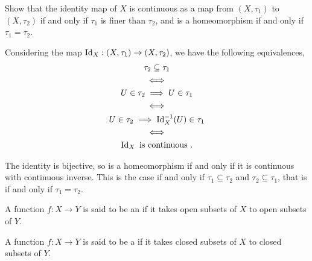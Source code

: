 \begin{exercise}
	\begin{problem}
	Show that the identity map of $ X $ is continuous as a map from $ ( X, \tau_{1} ) $ to $ ( X, \tau_{2} ) $ if and only if $ \tau_{1} $ is finer than $ \tau_{2} $, and is a homeomorphism if and only if $ \tau_{1} = \tau_{2} $.
	\end{problem}
	\begin{solution}
		Considering the map $ \operatorname{Id}_{X}:( X, \tau_{1} )\to ( X, \tau_{2} ) $, we have the following equivalences,
		\begin{gather*}
			\tau_{2} \subseteq \tau_{1}                                  \\
			\iff                                                         \\
			U \in \tau_{2} \implies U \in \tau_{1}                       \\
			\iff                                                         \\
			U \in \tau_{2} \implies \operatorname{Id}_{X}^{-1}( U ) \in \tau_{1} \\
			\iff                                                         \\
			\operatorname{Id}_{X} \text{ is continuous }.
		\end{gather*}

		The identity is bijective, so is a homeomorphism if and only if it is continuous with continuous inverse. This is the case if and only if $ \tau_{1} \subseteq \tau_{2} $ and $ \tau_{2} \subseteq \tau_{1} $, that is if and only if $ \tau_{1} = \tau_{2} $.
	\end{solution}
\end{exercise}

\begin{definition}
	A function $ f:X \to Y $ is said to be an  if it takes open subsets of $ X $ to open subsets of $ Y $.

	A function $ f:X \to Y $ is said to be a  if it takes closed subsets of $ X $ to closed subsets of $ Y $.
\end{definition}

